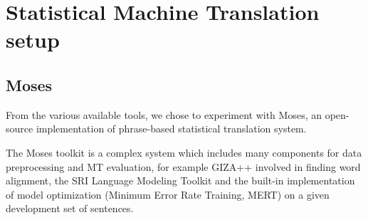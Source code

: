 \documentclass[11pt,letterpaper]{article}
\begin{document}



\section{Statistical Machine Translation setup}

\subsection{Moses}
From the various available tools, we chose to experiment with Moses, an open-source implementation of phrase-based statistical translation system.

The Moses toolkit \cite{moses} is a complex system which includes many components
for data preprocessing and MT evaluation, for example
GIZA++ %
involved in finding word alignment, the SRI Language Modeling
Toolkit %
and the built-in implementation of model optimization (Minimum Error Rate Training, MERT) on a
given development set of sentences.
\end{document}

